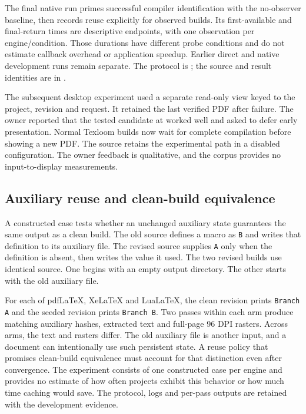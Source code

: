 The final native run primes successful compiler identification with the
no-observer baseline, then records reuse explicitly for observed builds.
Its first-available and final-return times are descriptive endpoints, with
one observation per engine/condition. Those durations have different probe
conditions and do not estimate callback overhead or application speedup.
Earlier direct and native development runs remain separate. The protocol is
; the source and result identities
are in .

The subsequent desktop experiment used a separate read-only view keyed to the
project, revision and request. It retained the last verified PDF after failure.
The owner reported that the tested candidate at  worked well and
asked to defer early presentation. Normal Texloom builds now wait for complete
compilation before showing a new PDF. The source retains the experimental path
in a disabled configuration. The owner feedback is qualitative, and the corpus
provides no input-to-display measurements.

\subsection{Auxiliary reuse and clean-build equivalence}

A constructed case tests whether an unchanged auxiliary state guarantees the
same output as a clean build. The old source defines a macro as \texttt{B} and
writes that definition to its auxiliary file. The revised source supplies
\texttt{A} only when the definition is absent, then writes the value it used.
The two revised builds use identical source. One begins with an empty output
directory. The other starts with the old auxiliary file.

For each of pdf\LaTeX{}, Xe\LaTeX{} and Lua\LaTeX{}, the clean revision prints
\texttt{Branch A} and the seeded revision prints \texttt{Branch B}. Two passes
within each arm produce matching auxiliary hashes, extracted text and full-page
96 DPI rasters. Across arms, the text and rasters differ. The old auxiliary
file is another input, and a document can intentionally use such persistent
state. A reuse policy that promises clean-build equivalence must account for
that distinction even after convergence. The experiment consists of one
constructed case per engine and provides no estimate of how often projects
exhibit this behavior or how much time caching would save. The protocol, logs and
per-pass outputs are retained with the development evidence.

